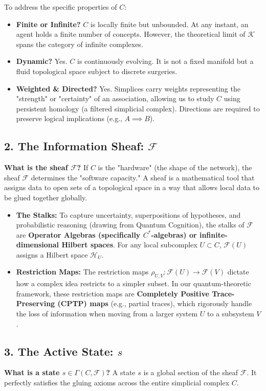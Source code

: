 \documentclass[12pt]{article}
\begin{document}
To address the specific properties of $C$:
\begin{itemize}
    \item \textbf{Finite or Infinite?} $C$ is locally finite but unbounded. At any instant, an agent holds a finite number of concepts. However, the theoretical limit of $\mathcal{K}$ spans the category of infinite complexes.
    \item \textbf{Dynamic?} Yes. $C$ is continuously evolving. It is not a fixed manifold but a fluid topological space subject to discrete surgeries.
    \item \textbf{Weighted \& Directed?} Yes. Simplices carry weights representing the "strength" or "certainty" of an association, allowing us to study $C$ using persistent homology (a filtered simplicial complex). Directions are required to preserve logical implications (e.g., $A \implies B$).
\end{itemize}

\subsection{2. The Information Sheaf: $\mathcal{F}$}
\textbf{What is the sheaf $\mathcal{F}$?}
If $C$ is the "hardware" (the shape of the network), the sheaf $\mathcal{F}$ determines the "software capacity." A sheaf is a mathematical tool that assigns data to open sets of a topological space in a way that allows local data to be glued together globally.

\begin{itemize}
    \item \textbf{The Stalks:} To capture uncertainty, superpositions of hypotheses, and probabilistic reasoning (drawing from Quantum Cognition), the stalks of $\mathcal{F}$ are \textbf{Operator Algebras (specifically $C^*$-algebras) or infinite-dimensional Hilbert spaces}. For any local subcomplex $U \subset C$, $\mathcal{F}(U)$ assigns a Hilbert space $\mathcal{H}_U$.
    \item \textbf{Restriction Maps:} The restriction maps $\rho_{U,V}: \mathcal{F}(U) \to \mathcal{F}(V)$ dictate how a complex idea restricts to a simpler subset. In our quantum-theoretic framework, these restriction maps are \textbf{Completely Positive Trace-Preserving (CPTP) maps} (e.g., partial traces), which rigorously handle the loss of information when moving from a larger system $U$ to a subsystem $V$.
\end{itemize}

\subsection{3. The Active State: $s$}
\textbf{What is a state $s \in \Gamma(C, \mathcal{F})$?}
A state $s$ is a global section of the sheaf $\mathcal{F}$. It perfectly satisfies the gluing axioms across the entire simplicial complex $C$.
\end{document}
